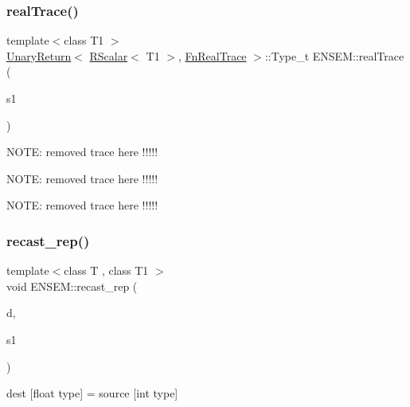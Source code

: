 \mbox{\label{group__rscalar_gad8c5ca0fef5f4bc08eb384e14b4017fa}} 
\subsubsection{\texorpdfstring{realTrace()}{realTrace()}}
{\footnotesize\ttfamily template$<$class T1 $>$ \\
\mbox{\hyperlink{structENSEM_1_1UnaryReturn}{Unary\+Return}}$<$ \mbox{\hyperlink{classENSEM_1_1RScalar}{R\+Scalar}}$<$ T1 $>$, \mbox{\hyperlink{structENSEM_1_1FnRealTrace}{Fn\+Real\+Trace}} $>$\+::Type\+\_\+t E\+N\+S\+E\+M\+::real\+Trace (\begin{DoxyParamCaption}\item[{const \mbox{\hyperlink{classENSEM_1_1RScalar}{R\+Scalar}}$<$ T1 $>$ \&}]{s1 }\end{DoxyParamCaption})\hspace{0.3cm}{\ttfamily [inline]}}

N\+O\+TE\+: removed trace here !!!!!

N\+O\+TE\+: removed trace here !!!!!

N\+O\+TE\+: removed trace here !!!!! \mbox{\label{group__rscalar_ga1ecb21d4e8fc1e664055d3fa1145f6e9}} 
\subsubsection{\texorpdfstring{recast\_rep()}{recast\_rep()}}
{\footnotesize\ttfamily template$<$class T , class T1 $>$ \\
void E\+N\+S\+E\+M\+::recast\+\_\+rep (\begin{DoxyParamCaption}\item[{\mbox{\hyperlink{classENSEM_1_1RScalar}{R\+Scalar}}$<$ T $>$ \&}]{d,  }\item[{const \mbox{\hyperlink{classENSEM_1_1RScalar}{R\+Scalar}}$<$ T1 $>$ \&}]{s1 }\end{DoxyParamCaption})\hspace{0.3cm}{\ttfamily [inline]}}



dest \mbox{[}float type\mbox{]} = source \mbox{[}int type\mbox{]} 

